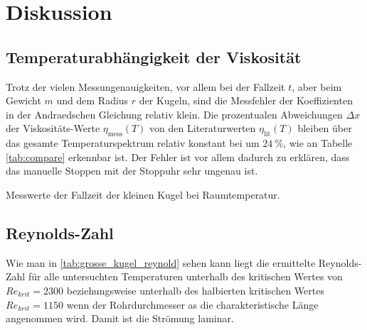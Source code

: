 \section{Diskussion}
\label{sec:Diskussion}

\subsection{Temperaturabhängigkeit der Viskosität}

Trotz der vielen Messungenauigkeiten, vor allem bei der Fallzeit $t$, aber
beim Gewicht $m$ und dem Radius $r$ der Kugeln, sind die Messfehler der
Koeffizienten in der Andraedschen Gleichung relativ klein.
Die prozentualen Abweichungen $\Delta x$ der Viskositäts-Werte
$\eta_\text{mess}(T)$ von den
Literaturwerten $\eta_\text{lit}(T)$ \cite{TfCuP}
bleiben über das gesamte Temperaturspektrum relativ konstant bei um $\SI{24}{\percent}$,
wie an Tabelle \ref{tab:compare} erkennbar ist.
Der Fehler ist vor allem dadurch zu erklären, dass das manuelle Stoppen mit der Stoppuhr sehr ungenau ist.


\begin{table}
  \centering
  
  \caption{Messwerte der Fallzeit der kleinen Kugel bei Raumtemperatur.}
  \label{tab:compare}
\end{table}


\subsection{Reynolds-Zahl}

Wie man in \autoref{tab:grosse_kugel_reynold} sehen kann liegt die ermittelte Reynolds-Zahl für alle
untersuchten Temperaturen unterhalb des kritischen Wertes von $Re_{krit} = 2300$
beziehungsweise unterhalb des halbierten kritischen Wertes $Re_{krit} = 1150$ wenn der Rohrdurchmesser as die charakteristische Länge angenommen wird.
Damit ist die Strömung laminar.